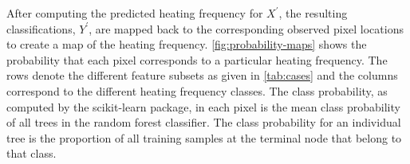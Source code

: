 After computing the predicted heating frequency for $X^\prime$, the resulting classifications, $Y^\prime$, are mapped back to the corresponding observed pixel locations to create a map of the heating frequency.
\autoref{fig:probability-maps} shows the probability that each pixel corresponds to a particular heating frequency.
The rows denote the different feature subsets as given in \autoref{tab:cases} and the columns correspond to the different heating frequency classes.
The class probability, as computed by the scikit-learn package, in each pixel is the mean class probability of all trees in the random forest classifier.
The class probability for an individual tree is the proportion of all training samples at the terminal node that belong to that class.

